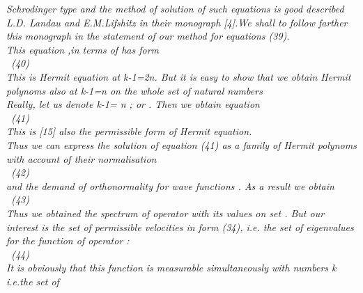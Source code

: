 \documentclass[a4paper,12pt] {article}
\begin{document}
{\it  Schrodinger type \rm and the method of solution of such equations is good described L.D. Landau
and E.M.Lifshitz in their monograph [4].We shall to follow farther this monograph in the statement of our
 method for equations (39).
\\This equation ,in terms of \myHighlight{$\xi , \Theta $}\coordHE{} has form
\\\coordHE{} \ (40) \\ This is \it   Hermit  equation \rm at
 k-1=2n. But it is easy to show that \it we obtain Hermit polynoms also at \rm  k-1=n \it on the whole set
 \coordHE{} \it of natural numbers \\ \rm Really, let us denote  k-1= n ; \coordHE{} or \coordHE{} .
 Then we obtain equation
\\\coordHE{} \ (41)\\
This is [15]  also the permissible form of Hermit  equation.\\Thus we can  express the  solution  of
equation (41)  as a   \it  family of Hermit polynoms \coordHE{}  \rm with account of their normalisation
\\\coordHE{} \ (42) \\and the demand of
 orthonormality for wave functions \myHighlight{$  \tilde \Psi $}\coordHE{}. As a result we obtain
\\\coordHE{}  \ (43)\\
Thus we obtained the \it spectrum of operator \coordHE{} \rm with its values on set
 \coordHE{}. But our interest is the \it set  of permissible velocities \rm in form (34), i.e. the
 \it set of  eigenvalues  for the function of  operator \coordHE{} :
\\\coordHE{}\rm  \ (44) \\ It
 is obviously \it  that this function is measurable simultaneously with  numbers \rm  k  i.e.\it the set  of
}
\end{document}
